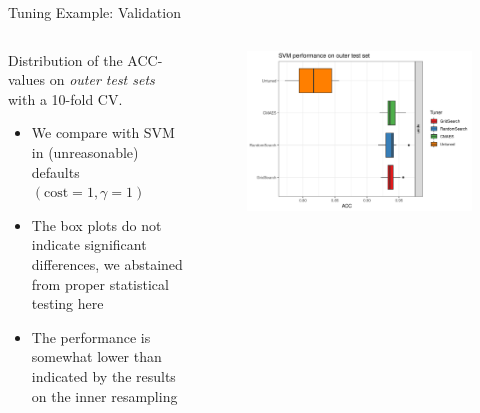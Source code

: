 \begin{frame}{Tuning Example: Validation}

\begin{columns}
\begin{column}{0.4\textwidth}

  Distribution of the ACC-values on \emph{outer test sets} with a 10-fold CV.


  \begin{itemize}
      \item We compare with SVM in (unreasonable) defaults $(\text{cost}=1,\gamma=1)$
    \item The box plots do not indicate significant differences, we abstained from proper statistical testing here
    \item The performance is somewhat lower than indicated by the results on the inner resampling
  \end{itemize}

\end{column}
\begin{column}{0.6\textwidth}
  \vspace{-1em}
  \begin{figure}
  \includegraphics[width=\textwidth]{images/benchmark_boxplot_default.png}
  \end{figure}
\end{column}
\end{columns}
\end{frame}


